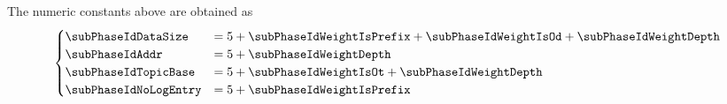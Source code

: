 \saNote{}
The numeric constants above are obtained as
\[
	\begin{cases}
		\subPhaseIdDataSize   & = 5 + \subPhaseIdWeightIsPrefix +   \subPhaseIdWeightIsOd + \subPhaseIdWeightDepth          \\
		\subPhaseIdAddr       & = 5 + \subPhaseIdWeightDepth          \\
		\subPhaseIdTopicBase  & = 5 + \subPhaseIdWeightIsOt + \subPhaseIdWeightDepth \\
		\subPhaseIdNoLogEntry & = 5 + \subPhaseIdWeightIsPrefix \\
	\end{cases}
\]
